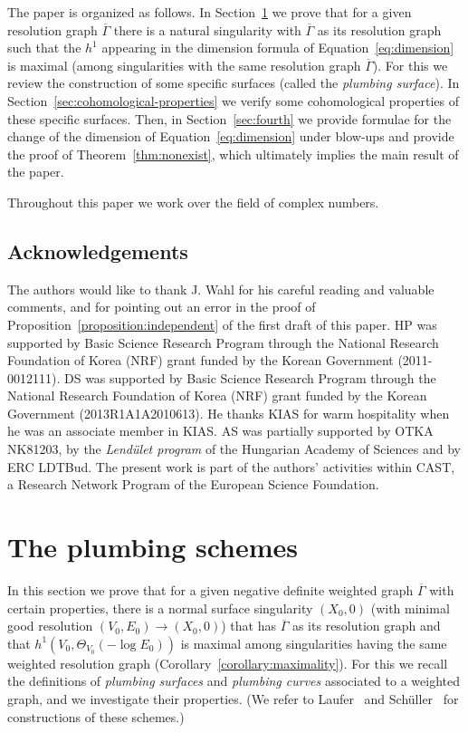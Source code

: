 \documentclass[a4paper, reqno, twoside]{amsart}
\theoremstyle{definition}
\numberwithin{equation}{section}
\begin{document}
The paper is organized as follows.
In Section~\ref{sec:plumbing} we prove that for a given resolution
graph $\overline{\Gamma}$ there is a natural singularity with
$\overline{\Gamma}$ as its resolution graph such that the $h^1$
appearing in the dimension formula of Equation~\eqref{eq:dimension} is
maximal (among singularities with the same resolution graph
$\overline{\Gamma}$). For this we review the construction of some
specific surfaces (called the \emph{plumbing surface}). In
Section~\ref{sec:cohomological-properties} we verify some
cohomological properties of these specific surfaces.  Then, in
Section~\ref{sec:fourth} we provide formulae for the change of the
dimension of Equation~\eqref{eq:dimension} under blow-ups and provide
the proof of Theorem~\ref{thm:nonexist}, which ultimately implies the
main result of the paper.

Throughout this paper we work over the field of complex
numbers.

\subsection*{Acknowledgements}
The authors would like to thank J. Wahl for his careful reading and
valuable comments, and for pointing out an error in the proof of
Proposition~\ref{proposition:independent} of the first draft of this
paper.  HP was supported by Basic Science Research Program through the
National Research Foundation of Korea (NRF) grant funded by the Korean
Government (2011-0012111). DS was supported by Basic Science Research
Program through the National Research Foundation of Korea (NRF) grant
funded by the Korean Government (2013R1A1A2010613). He thanks KIAS for
warm hospitality when he was an associate member in KIAS. AS was
partially supported by OTKA NK81203, by the \emph{Lend\"ulet program}
of the Hungarian Academy of Sciences and by ERC LDTBud. The present
work is part of the authors' activities within CAST, a Research
Network Program of the European Science Foundation.

\section{The plumbing schemes}
\label{sec:plumbing}
In this section we prove that for a given negative definite weighted
graph $\overline{\Gamma}$ with certain properties, there is a normal
surface singularity $(X_0, 0)$ (with minimal good resolution $(V_0,
E_0) \to (X_0,0)$) that has $\overline{\Gamma}$ as its resolution
graph and that $h^1(V_0, \Theta_{V_0}(-\log{E_0}))$ is maximal among
singularities having the same weighted resolution graph
(Corollary~\ref{corollary:maximality}). For this we recall the
definitions of \emph{plumbing surfaces} and \emph{plumbing curves}
associated to a weighted graph, and we investigate their
properties. (We refer to Laufer~\cite[Theorem~3.9]{Laufer-1973} and
Sch\"uller~\cite{Schuller-2012} for constructions of these schemes.)
\end{document}
